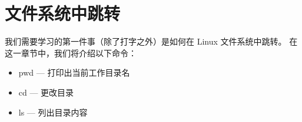 
\renewcommand\chapterillustration{cherry-tomatos}
\chapter{文件系统中跳转}

我们需要学习的第一件事（除了打字之外）是如何在 Linux 文件系统中跳转。 在这一章节中，我们将介绍以下命令：
\begin{itemize}
	\item pwd — 打印出当前工作目录名
	\item cd — 更改目录
	\item ls — 列出目录内容
\end{itemize}











